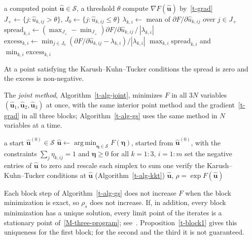 \documentclass[11pt]{article}
\theoremstyle{plain}
\theoremstyle{remark}
\numberwithin{equation}{section}
\begin{document}
\begin{algorithm}[ht]
\caption{Verification of the Karush--Kuhn--Tucker conditions}\label{t-alg-kkt}
\begin{algorithmic}[1]
\Require a computed point $\widehat{\bm u}\in\mathcal{S}$, a threshold $\theta$
\State compute $\nabla F\left(\widehat{\bm u}\right)$ by~\eqref{t-grad}
  \State $J_+\gets\{j:\widehat u_{k,ij}>\theta\}$, $J_0\gets\{j:\widehat u_{k,ij}\le\theta\}$
  \State $\lambda_{k,i}\gets$ mean of $\partial F/\partial\widehat u_{k,ij}$ over $j\in J_+$
  \State $\mathrm{spread}_{k,i}\gets\left(\max_{J_+}-\min_{J_+}\right)\partial F/\partial\widehat u_{k,ij}\,/\,|\lambda_{k,i}|$
  \State $\mathrm{excess}_{k,i}\gets\min_{j\in J_0}\left(\partial F/\partial\widehat u_{k,ij}-\lambda_{k,i}\right)/|\lambda_{k,i}|$
\EndFor
\State \Return $\max_{k,i}\mathrm{spread}_{k,i}$ and $\min_{k,i}\mathrm{excess}_{k,i}$
\end{algorithmic}
\end{algorithm}

At a point satisfying the Karush--Kuhn--Tucker conditions the spread is zero
and the excess is non-negative.

The \emph{joint method}, Algorithm~\ref{t-alg-joint}, minimizes $F$ in all $3N$
variables $\left(\widehat{\bm u}_1,\widehat{\bm u}_2,\widehat{\bm u}_3\right)$
at once, with the same interior point method and the gradient~\eqref{t-grad} in
all three blocks; Algorithm~\ref{t-alg-gs} uses the same method in $N$
variables at a time.

\begin{algorithm}[ht]
\caption{The joint method}\label{t-alg-joint}
\begin{algorithmic}[1]
\Require a start $\widehat{\bm u}^{(0)}\in\mathcal{S}$
\State $\widehat{\bm u}\gets\operatorname*{arg\,min}_{\bm\eta\in\mathcal{S}}F(\bm\eta)$,
started from $\widehat{\bm u}^{(0)}$, with the constraints
$\sum_j\eta_{k,ij}=1$ and $\bm\eta\ge 0$ for all $k=1:3$, $i=1:m$
\State set the negative entries of $\widehat{\bm u}$ to zero and rescale each simplex to sum one
\State verify the Karush--Kuhn--Tucker conditions at $\widehat{\bm u}$ (Algorithm~\ref{t-alg-kkt})
\State \Return $\widehat{\bm u}$, $\rho=\exp F\left(\widehat{\bm u}\right)$
\end{algorithmic}
\end{algorithm}

Each block step of Algorithm~\ref{t-alg-gs} does not increase $F$ when the
block minimization is exact, so $\rho_s$ does not increase. If, in addition,
every block minimization has a unique solution, every limit point of the
iterates is a stationary point of~\eqref{M-three-program};
see~\cite[Section 2.7]{1999Bertsekas}. Proposition~\ref{t-block1} gives this
uniqueness for the first block; for the second and the third it is not
guaranteed.
\end{document}
